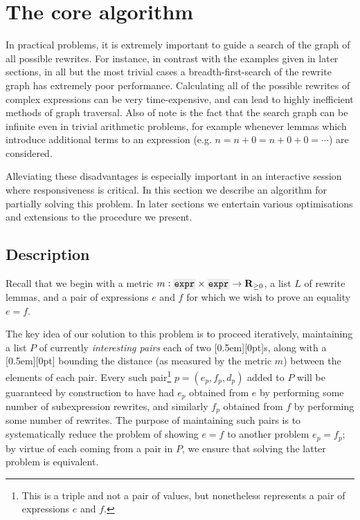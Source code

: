 \documentclass[a4paper]{article}
\newcommand{\RR}{\mathbf{R}}
\theoremstyle{plain}
\theoremstyle{definition}
\newcommand{\xx}[1]{{\colorbox{gray!15}{\raisebox{0em}[0.5em][0pt]{\makebox[\width-0.4em]{\texttt{#1}}}}}}
\newcommand{\expr}{\xx{expr}}
\begin{document}
\section{The core algorithm}

In practical problems, it is extremely important to guide a search of the graph of all possible rewrites. For instance, in contrast with the examples given in later sections, in all but the most trivial cases a breadth-first-search of the rewrite graph has extremely poor performance. Calculating all of the possible rewrites of complex expressions can be very time-expensive, and can lead to highly inefficient methods of graph traversal. Also of note is the fact that the search graph can be infinite even in trivial arithmetic problems, for example whenever lemmas which introduce additional terms to an expression (e.g. $n = n + 0 = n + 0 + 0 = \cdots$) are considered.

Alleviating these disadvantages is especially important in an interactive session where responsiveness is critical. In this section we describe an algorithm for partially solving this problem. In later sections we entertain various optimisations and extensions to the procedure we present.

\subsection{Description}

Recall that we begin with a metric $m : \expr{} \times \expr{} \to \RR_{\geq 0}$, a list $L$ of rewrite lemmas, and a pair of expressions $e$ and $f$ for which we wish to prove an equality $e = f$.

The key idea of our solution to this problem is to proceed iteratively, maintaining a list $P$ of currently \textit{interesting pairs} each of two \expr{}s, along with a \xx{dist\_est} bounding the distance (as measured by the metric $m$) between the elements of each pair. Every such pair\footnote{This is a triple and not a pair of values, but nonetheless represents a pair of expressions $e$ and $f$.} $p = (e_p, f_p, d_p)$ added to $P$ will be guaranteed by construction to have had $e_p$ obtained from $e$ by performing some number of subexpression rewrites, and similarly $f_p$ obtained from $f$ by performing some number of rewrites. The purpose of maintaining such pairs is to systematically reduce the problem of showing $e = f$ to another problem $e_p = f_p$; by virtue of each coming from a pair in $P$, we ensure that solving the latter problem is equivalent.
\end{document}
